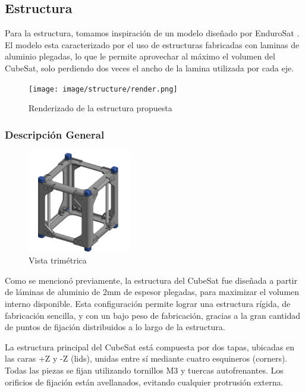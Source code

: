   \subsection{Estructura}
    Para la estructura, tomamos inspiración de un modelo diseñado por EnduroSat \cite{endurosat}. El
    modelo esta caracterizado por el uso de estructuras fabricadas con laminas de aluminio
    plegadas, lo que le permite aprovechar al máximo el volumen del CubeSat, solo perdiendo
    dos veces el ancho de la lamina utilizada por cada eje.

    \begin{figure}[H]
      \centering
      \texttt{[image: image/structure/render.png]}
      \caption{Renderizado de la estructura propuesta}
      \label{fig:render}
    \end{figure}

    \subsubsection{Descripción General}

      \begin{figure}
        \centering
        \includegraphics[width=0.4\textwidth]{image/structure/partes.png}
        \caption{Vista trimétrica}
        \label{fig:trimetrica}
      \end{figure}
      Como se mencionó previamente, la estructura del CubeSat fue diseñada a partir de láminas de aluminio
      de 2mm de espesor plegadas, para maximizar el volumen interno disponible. Esta configuración permite
      lograr una estructura rígida, de fabricación sencilla, y con un bajo peso de fabricación, gracias a
      la gran cantidad de puntos de fijación distribuidos a lo largo de la estructura.

      La estructura principal del CubeSat está compuesta por dos tapas, ubicadas en las caras +Z y -Z
      (lids), unidas entre sí mediante cuatro esquineros (corners). Todas las piezas se fijan utilizando
      tornillos M3 y tuercas autofrenantes. Los orificios de fijación están avellanados, evitando cualquier
      protrusión externa.

